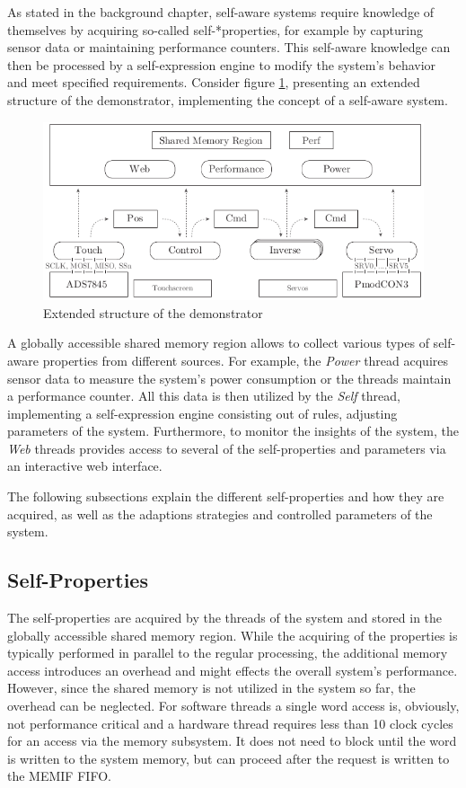 As stated in the background chapter, self-aware systems require knowledge of
themselves by acquiring so-called self-*properties, for example by capturing
sensor data or maintaining performance counters. This self-aware knowledge can
then be processed by a self-expression engine to modify the system's behavior
and meet specified requirements. Consider figure \ref{fig:demo_selfaware},
presenting an extended structure of the demonstrator, implementing the concept
of a self-aware system.
\begin{figure}
	\centering
	\includegraphics{../figures/demo_selfaware}
	\caption{Extended structure of the demonstrator}
	\label{fig:demo_selfaware}
\end{figure}
A globally accessible shared memory region allows to collect various types of
self-aware properties from different sources. For example, the \emph{Power}
thread acquires sensor data to measure the system's power consumption or the
threads maintain a performance counter. All this data is then utilized by the
\emph{Self} thread, implementing a self-expression engine consisting out of
rules, adjusting parameters of the system. Furthermore, to monitor the
insights of the system, the \emph{Web} threads provides access to several of
the self-properties and parameters via an interactive web interface.

The following subsections explain the different self-properties and how they
are acquired, as well as the adaptions strategies and controlled parameters of
the system.

\subsection{Self-Properties}

The self-properties are acquired by the threads of the system and stored in
the globally accessible shared memory region. While the acquiring of the
properties is typically performed in parallel to the regular processing, the
additional memory access introduces an overhead and might effects the
overall system's performance. However, since the shared memory is not utilized
in the system so far, the overhead can be neglected. For software threads a
single word access is, obviously, not performance critical and a hardware
thread requires less than 10 clock cycles for an access via the memory
subsystem. It does not need to block until the word is written to the system
memory, but can proceed after the request is written to the \ac{MEMIF}
\ac{FIFO}.

